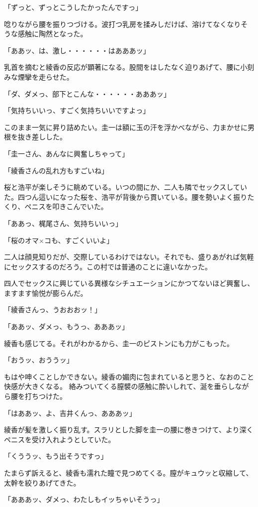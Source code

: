 ﻿\documentclass[book,tate]{jlreq}
\begin{document}
「ずっと、ずっとこうしたかったんですっ」

唸りながら腰を振りつづける。波打つ乳房を揉みしだけば、溶けてなくなりそうな感触に陶然となった。

「ああッ、は、激し・・・・・・はあああッ」

乳首を摘むと綾香の反応が顕著になる。股間をはしたなく迫りあげて、腰に小刻みな煙攣を走らせた。

「ダ、ダメっ、部下とこんな・・・・・・あああッ」

「気持ちいいっ、すごく気持ちいいですよっ」

このまま一気に昇り詰めたい。圭一は額に玉の汗を浮かべながら、力まかせに男根を抜き差しした。

「圭一さん、あんなに興奮しちゃって」

「綾香さんの乱れ方もすごいね」

桜と浩平が楽しそうに眺めている。いつの間にか、二人も隣でセックスしていた。四つん這いになった桜を、浩平が背後から貫いている。腰を勢いよく振りたくり、ペニスを叩きこんでいた。

「ああっ、梶尾さん、気持ちいいっ」

「桜のオマ×コも、すごくいいよ」

二人は顔見知りだが、交際しているわけではない。それでも、盛りあがれば気軽にセックスするのだろう。この村では普通のことに違いなかった。

四人でセックスに興じている異様なシチュエーションにかつてないほど興奮し、ますます愉悦が膨らんだ。

「綾香さんっ、うおおおッ！」

「ああッ、ダメっ、もうっ、あああッ」

綾香も感じてる。それがわかるから、圭一のピストンにも力がこもった。

「おうッ、おううッ」

もはや呻くことしかできない。綾香の媚肉に包まれていると思うと、なおのこと快感が大きくなる。 絡みついてくる膣襞の感触に酔いしれて、涎を垂らしながら腰を打ちつけた。

「はああッ、よ、吉井くんっ、あああッ」

綾香が髪を激しく振り乱す。スラリとした脚を圭一の腰に巻きつけて、より深くペニスを受け入れようとしていた。

「くううッ、もう出そうですっ」

たまらず訴えると、綾香も濡れた瞳で見つめてくる。膣がキュウッと収縮して、太幹を絞りあげてきた。

「あああッ、ダメっ、わたしもイッちゃいそうっ」
\end{document}
